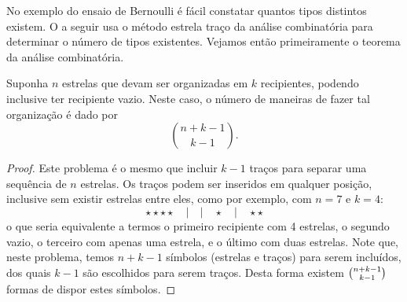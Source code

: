 \begin{marginfigure}%
  \caption{Particionamento do espaço de sequências de comprimento $n$.}
  \label{fig:particao-Xn2}
\end{marginfigure}


No exemplo do ensaio de Bernoulli é fácil constatar quantos tipos distintos existem.
O  a seguir usa o método estrela traço da análise combinatória para determinar
o número de tipos existentes. Vejamos então primeiramente o teorema da análise combinatória.

\begin{theorem}
    Suponha $n$ estrelas que devam ser organizadas em $k$ recipientes, podendo inclusive
    ter recipiente vazio.
    Neste caso, o número de maneiras de fazer tal organização é dado por
    \begin{equation}
	  \binom{n+k-1}{k-1} .
    \end{equation}
\end{theorem}
\begin{proof}
Este problema é o mesmo que incluir $k-1$ traços para separar uma sequência de $n$ estrelas.
Os traços podem ser inseridos em qualquer posição, inclusive sem existir estrelas entre eles,
como por exemplo, com $n=7$ e $k=4$:
$$\star \star \star \star \quad | \quad | \quad \star \quad | \quad \star \star$$ 
o que seria equivalente a termos o primeiro recipiente com 4 estrelas, o segundo vazio, o terceiro
com apenas uma estrela, e o último com duas estrelas.
Note que, neste problema, temos $n+k-1$ símbolos (estrelas e traços) para serem incluídos, dos
quais $k-1$ são escolhidos para serem traços. Desta forma existem $\tbinom{n+k-1}{k-1}$
formas de dispor estes símbolos.
\end{proof}

